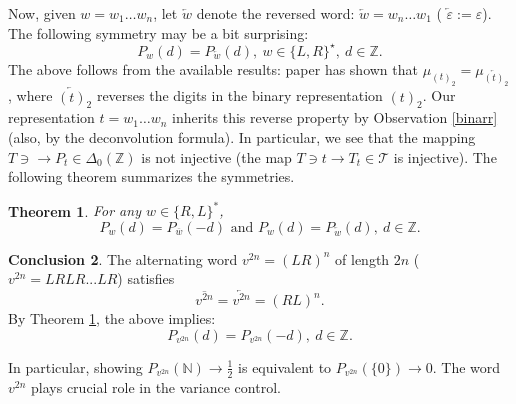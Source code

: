 \documentclass[10pt]{amsart}
\newtheorem{theorem}{Theorem}
\theoremstyle{definition}
\newtheorem{conclusion}[theorem]{Conclusion}
\numberwithin{equation}{section}
\newcommand{\N}{\mathbb{N}}
\newcommand{\Z}{\mathbb{Z}}
\newcommand{\TT}{\mathcal{T}}
\begin{document}
Now, given $w=w_1\dots w_n$, let $\overleftarrow{w}$ denote the reversed word: $\overleftarrow{w}=w_n\dots w_1$ ( $\overleftarrow{\varepsilon}:=\varepsilon$). The following symmetry may be a bit surprising:
\begin{equation}\label{sym2}
P_w(d)=P_{\overleftarrow{w}}(d),\ w\in\{L,R\}^\star,\ d\in\Z .
\end{equation}
The above follows from the available results: paper \cite{MS} has shown that 
$\mu_{(t)_2}=\mu_{\overleftarrow{(t)}_2}$, where $\overleftarrow{(t)}_2$ reverses the digits in the binary representation $(t)_2$. Our representation $t=w_1\dots w_n$ inherits this reverse property by Observation \ref{binarr} (also, by the deconvolution formula). In particular, we see that the mapping $T\ni \to P_t\in\Delta_0(\Z)$ is not injective (the map $T\ni t\to T_t\in\TT$ is injective). The following theorem summarizes the symmetries.
\begin{theorem}\label{tsym}
For any $w\in\{R,L\}^*$, 
$$P_w(d)=P_{\overline{w}}(-d)\mbox{ and }P_w(d)=P_{\overleftarrow{w}}(d),\ d\in\Z.$$
\end{theorem}
\begin{conclusion}The alternating word $v^{2n} = (LR)^n$ of length $2n$ ($v^{2n}=LRLR...LR$) satisfies
$$\overline{v^{2n}} =  \overleftarrow{v^{2n}}=(RL)^n.$$  
 By Theorem \ref{tsym}, the above  implies:
$$P_{v^{2n}}(d)=P_{v^{2n}}(-d),\  d\in\Z.$$
\end{conclusion}
In particular,  showing $P_{v^{2n}}(\N)\to \frac12$ is equivalent to $P_{v^{2n}}(\{0\})\to 0$. The word  $v^{2n}$ plays crucial role in the variance control.
\end{document}

